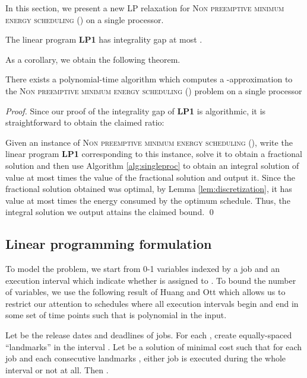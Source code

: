 In this section, we present a new LP relaxation for \textsc{Non preemptive minimum energy scheduling ()} on a single processor. 
\begin{thm}\label{thm:intgap}
The linear program  \textbf{LP1} has integrality gap at most .
\end{thm}
As a corollary, we obtain the following theorem. 
 

\begin{thm}\label{thm:existsingproc}
  There exists a polynomial-time algorithm which computes a -approximation to the \textsc{Non preemptive minimum energy scheduling ()} problem on a single processor
\end{thm}
\begin{proof}
Since our proof of the integrality gap of \textbf{LP1} is algorithmic, it is straightforward to obtain the claimed ratio:

Given an instance of \textsc{Non preemptive minimum energy scheduling ()}, write the linear program \textbf{LP1} corresponding to this instance, solve it to obtain a fractional solution and then use Algorithm \ref{alg:singleproc} to obtain an integral solution of value at most  times the value of the fractional solution and output it. Since the fractional solution obtained was optimal, by Lemma \ref{lem:discretization}, it has value at most  times the energy consumed by the optimum schedule. Thus, the integral solution we output attains the claimed bound.
\qed \end{proof}

\subsection{Linear programming formulation}

To model the problem, we start from 0-1 variables  indexed by a job  and an execution interval  which indicate whether  is assigned to . To bound the number of variables, we use the following result of Huang and Ott \cite{Huang_Ott} which allows us to restrict our attention to schedules where all execution intervals begin and end in some set   of time points such that  is  polynomial in the input.



\begin{lem}\label{lem:discretization}\cite{Huang_Ott}
    Let  be the release dates and deadlines of jobs.
    For each , create  equally-spaced ``landmarks'' in the interval .
    Let  be a solution of minimal cost such that for each job  and each consecutive landmarks , either
    job  is executed during the whole interval  or not at all.
    Then .
\end{lem}


